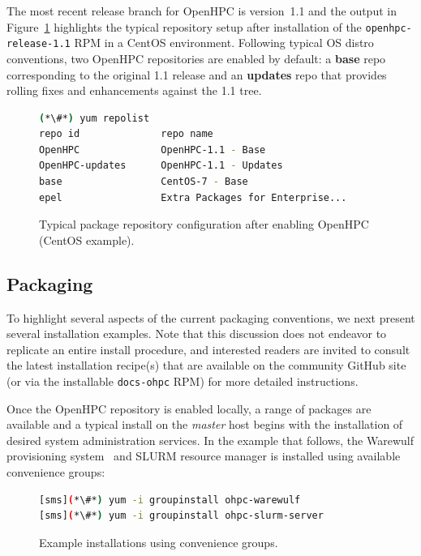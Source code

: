 \documentclass{sig-alternate-05-2015}
\begin{document}
The most recent release branch for OpenHPC is version~1.1 and the output in
Figure~\ref{fig:repolist} highlights the typical repository setup after
installation of the \texttt{openhpc-release-1.1} RPM in a CentOS
environment. Following typical OS distro conventions, two OpenHPC
repositories are enabled by default: a { \bf base} repo corresponding to the
original 1.1 release and an {\bf updates} repo that provides rolling fixes and
enhancements against the 1.1 tree.

\begin{figure}[h]
\begin{lstlisting}[language=bash,keywords={}]
(*\#*) yum repolist
repo id              repo name
OpenHPC              OpenHPC-1.1 - Base
OpenHPC-updates      OpenHPC-1.1 - Updates
base                 CentOS-7 - Base
epel                 Extra Packages for Enterprise...
\end{lstlisting}
\vspace*{-0.3cm}
  \caption{Typical package repository configuration after enabling OpenHPC
    (CentOS example).}
    \label{fig:repolist}
\end{figure}

\subsection{Packaging} \label{sec:packaging}

To highlight several aspects of the current packaging conventions, we next
present several installation examples. Note that this
discussion does not endeavor to replicate an entire install procedure, and
interested readers are invited to consult the latest installation recipe(s) that
are available on the community GitHub site (or via the installable
\texttt{docs-ohpc} RPM) for more detailed instructions.

Once the OpenHPC repository is enabled locally, a range of packages are
available and a typical install on the {\em master} host begins with the
installation of desired system administration services. In the example that
follows, the Warewulf provisioning system~\cite{warewulf_url} and SLURM
resource manager is installed using available convenience groups:

\begin{figure}[h]
\begin{lstlisting}[language=bash,keywords={}]
[sms](*\#*) yum -i groupinstall ohpc-warewulf
[sms](*\#*) yum -i groupinstall ohpc-slurm-server
\end{lstlisting}
\vspace*{-0.3cm}
  \caption{Example installations using convenience groups.}
    \label{fig:grouplinstall}
\end{figure}
\end{document}
